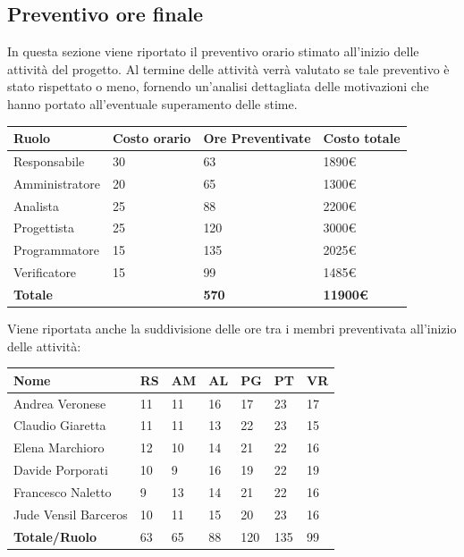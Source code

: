 \documentclass[12pt]{article}
\begin{document}
\subsection{Preventivo ore finale}
In questa sezione viene riportato il preventivo orario stimato all'inizio delle attività del progetto. Al termine delle attività verrà valutato se tale preventivo è stato rispettato o meno, fornendo un'analisi dettagliata delle motivazioni che hanno portato all'eventuale superamento delle stime.
\begin{center}  
    \begin{tabular}{|l|l|l|l|}
        \hline
        \textbf{Ruolo} & \textbf{Costo orario} & \textbf{Ore Preventivate} & \textbf{Costo totale}\\
        \hline
        Responsabile & 30 & 63 & 1890\euro  \\ 
        \hline
        Amministratore & 20 & 65 & 1300\euro \\
        \hline
        Analista & 25 & 88 & 2200\euro \\
        \hline
        Progettista & 25 & 120 & 3000\euro \\
        \hline
        Programmatore & 15 & 135 & 2025\euro \\
        \hline
        Verificatore & 15 & 99 & 1485\euro \\
        \hline
        \textbf{Totale} &  & \textbf{570} & \textbf{11900\euro} \\
        \hline
    \end{tabular}
\end{center}

Viene riportata anche la suddivisione delle ore tra i membri preventivata all'inizio delle attività:
\begin{center}  
    \begin{tabular}{|l|l|l|l|l|l|l|}
        \hline
        \textbf{Nome} & \textbf{RS} & \textbf{AM} & \textbf{AL} & \textbf{PG} & \textbf{PT} & \textbf{VR}\\
        \hline
        Andrea Veronese & 11 & 11 & 16 & 17 & 23 & 17  \\
        \hline
        Claudio Giaretta & 11 & 11 & 13 & 22 & 23 & 15\\
        \hline
        Elena Marchioro & 12 & 10 & 14 & 21 & 22 & 16 \\
        \hline
        Davide Porporati & 10 & 9 & 16 & 19 & 22 & 19 \\
        \hline
        Francesco Naletto & 9 & 13 & 14 & 21 & 22 & 16 \\
        \hline
        Jude Vensil Barceros & 10 & 11 & 15 & 20 & 23 & 16 \\
        \hline
        \textbf{Totale/Ruolo} & 63 & 65 & 88 & 120 & 135 & 99 \\
        \hline
    \end{tabular}
\end{center}
\end{document}
